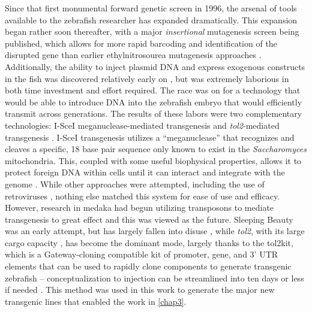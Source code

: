 Since that first monumental forward genetic screen in 1996, the arsenal of tools available to the zebrafish researcher has expanded dramatically. This expansion began rather soon thereafter, with a major \textit{insertional} mutagenesis screen being published, which allows for more rapid barcoding and identification of the disrupted gene than earlier ethylnitrosourea mutagenesis approaches \citep{Amsterdam1999}. Additionally, the ability to inject plasmid DNA and express exogenous constructs in the fish was discovered relatively early on \citep{Stuart1988, Lele1996}, but was extremely laborious in both time investment and effort required. The race was on for a technology that would be able to introduce DNA into the zebrafish embryo that would efficiently transmit across generations. The results of these labors were two complementary technologies: I-SceI meganuclease-mediated transgenesis \citep{Thermes2002} and \textit{tol2}-mediated transgenesis \citep{Kwan2007}. I-SceI transgenesis utilizes a ``meganuclease'' that recognizes and cleaves a specific, 18 base pair sequence only known to exist in the \textit{Saccharomyces} mitochondria. This, coupled with some useful biophysical properties, allows it to protect foreign DNA within cells until it can interact and integrate with the genome \citep{Soroldoni2009, Grabher2004}. While other approaches were attempted, including the use of retroviruses \citep{Kurita2004}, nothing else matched this system for ease of use and efficacy. However, research in medaka had begun utilizing transposons to mediate transgenesis to great effect and this was viewed as the future. Sleeping Beauty was an early attempt, but has largely fallen into disuse \citep{Davidson2003}, while \textit{tol2}, with its large cargo capacity \citep{Balciunas2006}, has become the dominant mode, largely thanks to the tol2kit, which is a Gateway-cloning compatible kit of promoter, gene, and 3' UTR elements that can be used to rapidly clone components to generate transgenic zebrafish -- conceptualization to injection can be streamlined into ten days or less if needed \citep{Kwan2007}. This method was used in this work to generate the major new transgenic lines that enabled the work in \autoref{chap3}.

